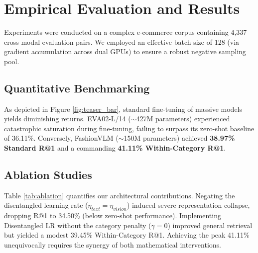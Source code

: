 \documentclass[conference]{IEEEtran}
\begin{document}
\section{Empirical Evaluation and Results}
Experiments were conducted on a complex e-commerce corpus containing 4,337 cross-modal evaluation pairs. We employed an effective batch size of 128 (via gradient accumulation across dual GPUs) to ensure a robust negative sampling pool.

\subsection{Quantitative Benchmarking}
As depicted in Figure \ref{fig:teaser_bar}, standard fine-tuning of massive models yields diminishing returns. EVA02-L/14 ($\sim$427M parameters) experienced catastrophic saturation during fine-tuning, failing to surpass its zero-shot baseline of 36.11\%. Conversely, FashionVLM ($\sim$150M parameters) achieved \textbf{38.97\% Standard R@1} and a commanding \textbf{41.11\% Within-Category R@1}.

\subsection{Ablation Studies}
Table \ref{tab:ablation} quantifies our architectural contributions. Negating the disentangled learning rate ($\eta_{text} = \eta_{vision}$) induced severe representation collapse, dropping R@1 to 34.50\% (below zero-shot performance). Implementing Disentangled LR without the category penalty ($\gamma = 0$) improved general retrieval but yielded a modest 39.45\% Within-Category R@1. Achieving the peak 41.11\% unequivocally requires the synergy of both mathematical interventions.

\begin{table}[htbp]
\caption{Ablation Study of Algorithmic Interventions}
\label{tab:ablation}
\centering
{}
\end{table}
\end{document}
